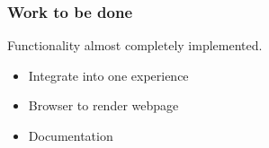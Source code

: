 \documentclass{beamer}
\begin{document}
\begin{frame}
  \frametitle{Work to be done}
  Functionality almost completely implemented.

  \begin{itemize}
    \item Integrate into one experience
    \item Browser to render webpage
    \item Documentation
  \end{itemize}
\end{frame}

\frame{\titlepage}
\end{document}
